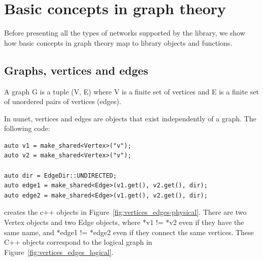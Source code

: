 \chapter{Basic concepts in graph theory}
\label{ch:graphtheory}

Before presenting all the types of networks supported by the library, we show how basic concepts in graph theory map to library objects and functions.

\section{Graphs, vertices and edges}

\begin{definition}[Graph]
A graph G is a tuple (V, E) where V is a finite set of vertices and E is a finite set of unordered pairs of vertices (edges).
\end{definition}

In uunet, vertices and edges are objects that exist independently of a graph. The following code:

\begin{lstlisting}[style=c++]
auto v1 = make_shared<Vertex>("v");
auto v2 = make_shared<Vertex>("v");
    
auto dir = EdgeDir::UNDIRECTED;
auto edge1 = make_shared<Edge>(v1.get(), v2.get(), dir);
auto edge2 = make_shared<Edge>(v1.get(), v2.get(), dir);
\end{lstlisting}

\noindent creates the c++ objects in Figure~\ref{fig:vertices_edges-physical}. There are two Vertex objects and two Edge objects, where *v1 != *v2 even if they have the same name, and *edge1 != *edge2 even if they connect the same vertices.
These C++ objects correspond to the logical graph in Figure~\ref{fig:vertices_edges_logical}.

